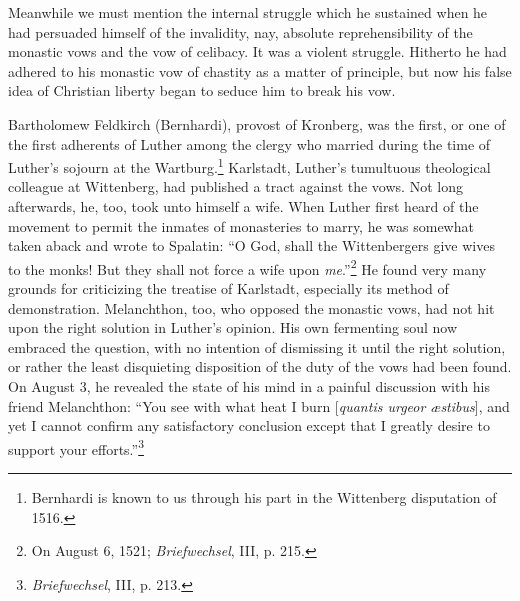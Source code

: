 Meanwhile we must mention the internal struggle which he sustained when
he had persuaded himself of the invalidity, nay, absolute
reprehensibility of the monastic vows and the vow of celibacy. It
was a violent struggle. Hitherto he had adhered to his monastic vow
of chastity as a matter of principle, but now his false idea of Christian
liberty began to seduce him to break his vow.

Bartholomew Feldkirch (Bernhardi), provost of Kronberg, was
the first, or one of the first adherents of Luther among the clergy
who married during the time of Luther’s sojourn at the Wartburg.\footnote
{Bernhardi is known to us through his part in the Wittenberg disputation of 1516.}
Karlstadt, Luther’s tumultuous theological colleague at Wittenberg,
had published a tract against the vows. Not long afterwards, he,
too, took unto himself a wife. When Luther first heard of the movement
to permit the inmates of monasteries to marry, he was
somewhat taken aback and wrote to Spalatin: “O God, shall the Wittenbergers
give wives to the monks! But they shall not force a wife
upon \textit{me}.”\footnote{On August 6, 1521; \textit{Briefwechsel}, III, p. 215.}
He found very many grounds for criticizing the treatise of Karlstadt, especially
its method of demonstration. Melanchthon, too, who opposed the monastic vows, had not hit upon the
right solution in Luther’s opinion. His own fermenting soul now
embraced the question, with no intention of dismissing it until the
right solution, or rather the least disquieting disposition of the duty of
the vows had been found. On August 3, he revealed the state of his
mind in a painful discussion with his friend Melanchthon: “You see
with what heat I burn [\textit{quantis urgeor æstibus}], and yet I cannot
confirm any satisfactory conclusion except that I greatly desire to
support your efforts.”\footnote{\textit{Briefwechsel}, III, p. 213.}

